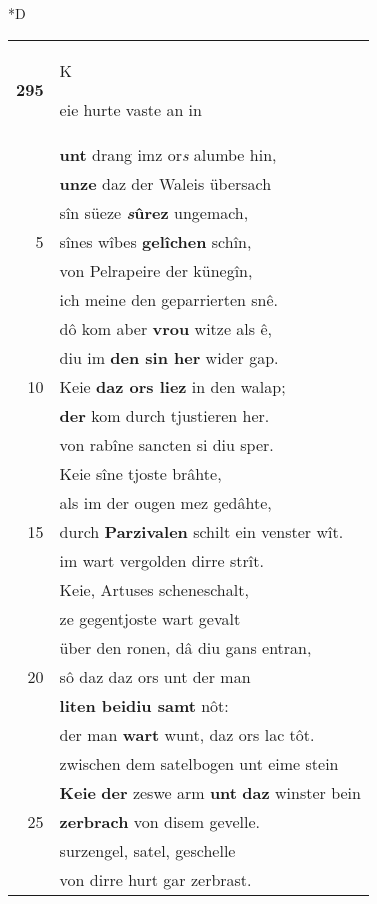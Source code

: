 \documentclass[8pt,a4paper,notitlepage]{article}
\begin{document}
\begin{table}[ht]
\begin{minipage}[t]{0.5\linewidth}
\small
\begin{center}*D
\end{center}
\begin{tabular}{rl}
\textbf{295} & \begin{large}K\end{large}eie hurte vaste an in\\ 
 & \textbf{unt} drang imz or\textit{s} alumbe hin,\\ 
 & \textbf{unze} daz der Waleis übersach\\ 
 & sîn süeze \textbf{\textit{s}ûrez} ungemach,\\ 
5 & sînes wîbes \textbf{gelîchen} schîn,\\ 
 & von Pelrapeire der künegîn,\\ 
 & ich meine den geparrierten snê.\\ 
 & dô kom aber \textbf{vrou} witze als ê,\\ 
 & diu im \textbf{den sin her} wider gap.\\ 
10 & Keie \textbf{daz ors liez} in den walap;\\ 
 & \textbf{der} kom durch tjustieren her.\\ 
 & von rabîne sancten si diu sper.\\ 
 & Keie sîne tjoste brâhte,\\ 
 & als im der ougen mez gedâhte,\\ 
15 & durch \textbf{Parzivalen} schilt ein venster wît.\\ 
 & im wart vergolden dirre strît.\\ 
 & Keie, Artuses scheneschalt,\\ 
 & ze gegentjoste wart gevalt\\ 
 & über den ronen, dâ diu gans entran,\\ 
20 & sô daz daz ors unt der man\\ 
 & \textbf{liten beidiu samt} nôt:\\ 
 & der man \textbf{wart} wunt, daz ors lac tôt.\\ 
 & zwischen dem satelbogen unt eime stein\\ 
 & \textbf{Keie} \textbf{der} zeswe arm \textbf{unt} \textbf{daz} winster bein\\ 
25 & \textbf{zerbrach} von disem gevelle.\\ 
 & surzengel, satel, geschelle\\ 
 & von dirre hurt gar zerbrast.\\ 

\end{tabular}
\end{minipage}
\end{table}
\end{document}
